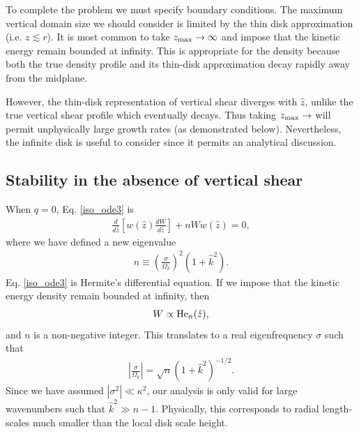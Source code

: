 To complete the problem we must specify boundary conditions. The
maximum vertical domain size we should consider is limited by the thin disk
approximation (i.e. $z\lesssim r$). It is most common to take $z_\mathrm{max}\to\infty$
and impose that the kinetic  energy remain bounded at infinity.  This
is appropriate for the density because both the true density profile
and its thin-disk approximation decay rapidly away from the midplane.   

However, the thin-disk representation of vertical shear diverges with 
$\hat{z}$, unlike the true vertical shear profile which eventually
decays.  Thus taking $z_\mathrm{max}\to$ will permit unphysically large growth
rates (as demonstrated below). Nevertheless, the infinite disk is
useful to consider since it permits an analytical discussion. 

\subsection{Stability in the absence of vertical shear}
When $q=0$, Eq. \ref{iso_ode3} is
\begin{align}\label{hermite_ode}
  \frac{d}{d\hat{z}}\left[w(\hat{z})\frac{dW}{d\hat{z}}\right] + nW
  w(\hat{z}) =0, 
\end{align}
where we have defined a new eigenvalue
\begin{align}
  n \equiv \left(\frac{\sigma}{\Omega_k}\right)^2(1+\hat{k}^2). 
\end{align} 
Eq. \ref{iso_ode3} is Hermite's differential equation. If we impose
that the kinetic energy density remain bounded at infinity, then  
\begin{align}
  W \propto \operatorname{He}_n(\hat{z}),
\end{align}
and $n$ is a non-negative integer. This translates to a real
eigenfrequency $\sigma$ such that
\begin{align}
  \left|\frac{\sigma}{\Omega_k}\right| = \sqrt{n}
  \left(1+\hat{k}^2\right)^{-1/2}. 
\end{align}
Since we have assumed $|\sigma^2|\ll \kappa^2$, our analysis is only
valid for large wavenumbers such that $\hat{k}^2\gg 
n-1$. Physically, this corresponds to radial length-scales much
smaller than the local disk scale height. 

